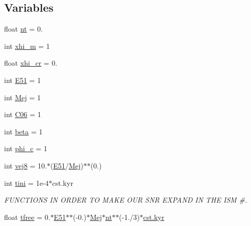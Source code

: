 \subsection*{Variables}
\begin{DoxyCompactItemize}
\item 
float \hyperlink{namespaceEscapeModel__protons_aea8f96db5e10e84cf033c2f0000e9642}{nt} = 0.
\item 
int \hyperlink{namespaceEscapeModel__protons_a268b081a857bf50124b57d6cee248852}{xhi\+\_\+m} = 1
\item 
float \hyperlink{namespaceEscapeModel__protons_a0448c3c4f8095c021886f1311a7dd513}{xhi\+\_\+cr} = 0.
\item 
int \hyperlink{namespaceEscapeModel__protons_af064ce6137662206b44cb8189188c577}{E51} = 1
\item 
int \hyperlink{namespaceEscapeModel__protons_a55a313f4e7119d936467f0bf634eefec}{Mej} = 1
\item 
int \hyperlink{namespaceEscapeModel__protons_a2f5b1f50d1253d9a948906d240a4260c}{C06} = 1
\item 
int \hyperlink{namespaceEscapeModel__protons_aed6ba9747962e8235f612edf7305ae9f}{beta} = 1
\item 
int \hyperlink{namespaceEscapeModel__protons_a01a29f96fd38c4ae6fd0e3ad0eb033dc}{phi\+\_\+c} = 1
\item 
int \hyperlink{namespaceEscapeModel__protons_a51efb65ca73d6b2db5b62be43dedf522}{vej8} = 10.$\ast$(\hyperlink{namespaceEscapeModel__protons_af064ce6137662206b44cb8189188c577}{E51}/\hyperlink{namespaceEscapeModel__protons_a55a313f4e7119d936467f0bf634eefec}{Mej})$\ast$$\ast$(0.)
\item 
int \hyperlink{namespaceEscapeModel__protons_a8adf11ae890ffc4b073e4b86548465aa}{tini} = 1e-\/4$\ast$cst.\+kyr
\begin{DoxyCompactList}\small\item\em F\+U\+N\+C\+T\+I\+O\+NS IN O\+R\+D\+ER TO M\+A\+KE O\+UR S\+NR E\+X\+P\+A\+ND IN T\+HE I\+SM \#. \end{DoxyCompactList}\item 
float \hyperlink{namespaceEscapeModel__protons_ab0de8bc17835b3b00d3ab940c83c199f}{tfree} = 0.$\ast$\hyperlink{namespaceEscapeModel__protons_af064ce6137662206b44cb8189188c577}{E51}$\ast$$\ast$(-\/0.)$\ast$\hyperlink{namespaceEscapeModel__protons_a55a313f4e7119d936467f0bf634eefec}{Mej}$\ast$\hyperlink{namespaceEscapeModel__protons_aea8f96db5e10e84cf033c2f0000e9642}{nt}$\ast$$\ast$(-\/1./3)$\ast$\hyperlink{constants_8h_a0edf155739e92555799f4a04b10af6bf}{cst.\+kyr}
$$
\end{DoxyCompactItemize}
